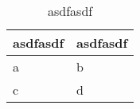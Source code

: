 \label{app:guia-entrevista-director}
\begin{table}
	\caption{asdfasdf}\label{tab:adsfadf}
	\begin{center}
		\begin{tabular}[c]{l|l}
			\hline
			\multicolumn{1}{c|}{\textbf{asdfasdf}} &
			\multicolumn{1}{c}{\textbf{asdfasdf}}      \\
			\hline
			a                                      & b \\
			c                                      & d \\
			\hline
		\end{tabular}
	\end{center}
\end{table}
